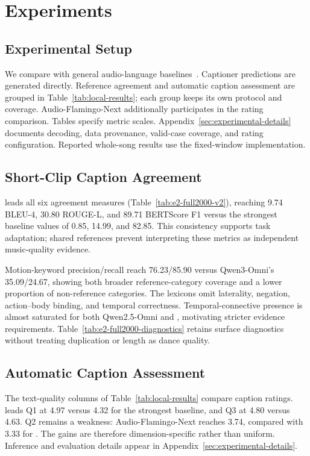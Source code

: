 \section{Experiments}
\label{sec:experiments}

\subsection{Experimental Setup}
\label{sec:exp-protocol}
We compare \captioner with general audio-language
baselines~\cite{qwen3omni,mossaudio,mossmusic,musicflamingo,audioflamingo3,qwen25omni}.
Captioner predictions are generated directly.
Reference agreement and automatic caption assessment are grouped in
Table~\ref{tab:local-results}; each group keeps its own protocol and coverage.
Audio-Flamingo-Next additionally participates in the rating comparison.
Tables specify
metric scales. Appendix~\ref{sec:experimental-details} documents decoding,
data provenance, valid-case coverage, and rating configuration.
Reported whole-song results use the fixed-window implementation.

\subsection{Short-Clip Caption Agreement}
\label{sec:exp-reference}
\captioner leads all six agreement measures (Table~\ref{tab:e2-full2000-v2}),
reaching 9.74 BLEU-4, 30.80 ROUGE-L, and 89.71 BERTScore F1 versus
the strongest baseline values of 0.85, 14.99, and 82.85. This consistency
supports task adaptation; shared references prevent interpreting these
metrics as independent music-quality evidence.

Motion-keyword precision/recall reach 76.23/85.90 versus Qwen3-Omni's
35.09/24.67, showing both broader reference-category coverage and a
lower proportion of non-reference categories. The lexicons omit
laterality, negation, action--body binding, and temporal correctness.
Temporal-connective presence is almost saturated for both Qwen2.5-Omni
and \captioner, motivating stricter evidence
requirements. Table~\ref{tab:e2-full2000-diagnostics} retains surface
diagnostics without treating duplication or length as dance quality.

\subsection{Automatic Caption Assessment}
\label{sec:exp-refinement}
The text-quality columns of Table~\ref{tab:local-results} compare caption ratings.
\captioner leads Q1 at 4.97 versus 4.32 for the strongest baseline, and Q3 at
4.80 versus 4.63. Q2 remains a weakness: Audio-Flamingo-Next reaches
3.74, compared with 3.33 for \captioner. The gains are therefore
dimension-specific rather than uniform. Inference and evaluation
details appear in Appendix~\ref{sec:experimental-details}.

